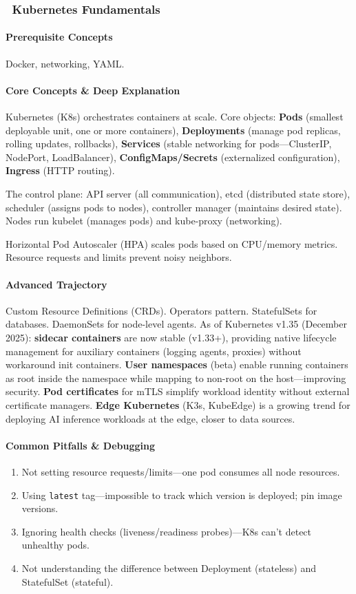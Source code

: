 \documentclass[11pt, a4paper, oneside]{report}
\newcommand{\mustmaster}[1]{\subsubsection{\texorpdfstring{\fcolorbox{blue!40!black}{blue!8}{\footnotesize\bfseries\color{blue!40!black} MUST MASTER}~#1}{#1}}}
\begin{document}
\mustmaster{Kubernetes Fundamentals}

\paragraph{Prerequisite Concepts} Docker, networking, YAML.

\paragraph{Core Concepts \& Deep Explanation} Kubernetes (K8s) orchestrates containers at scale. Core objects: \textbf{Pods} (smallest deployable unit, one or more containers), \textbf{Deployments} (manage pod replicas, rolling updates, rollbacks), \textbf{Services} (stable networking for pods---ClusterIP, NodePort, LoadBalancer), \textbf{ConfigMaps/Secrets} (externalized configuration), \textbf{Ingress} (HTTP routing).

The control plane: API server (all communication), etcd (distributed state store), scheduler (assigns pods to nodes), controller manager (maintains desired state). Nodes run kubelet (manages pods) and kube-proxy (networking).

Horizontal Pod Autoscaler (HPA) scales pods based on CPU/memory metrics. Resource requests and limits prevent noisy neighbors.

\paragraph{Advanced Trajectory} Custom Resource Definitions (CRDs). Operators pattern. StatefulSets for databases. DaemonSets for node-level agents. As of Kubernetes v1.35 (December 2025): \textbf{sidecar containers} are now stable (v1.33+), providing native lifecycle management for auxiliary containers (logging agents, proxies) without workaround init containers. \textbf{User namespaces} (beta) enable running containers as root inside the namespace while mapping to non-root on the host---improving security. \textbf{Pod certificates} for mTLS simplify workload identity without external certificate managers. \textbf{Edge Kubernetes} (K3s, KubeEdge) is a growing trend for deploying AI inference workloads at the edge, closer to data sources.

\paragraph{Common Pitfalls \& Debugging}
\begin{enumerate}[leftmargin=*]
\item Not setting resource requests/limits---one pod consumes all node resources.
\item Using \texttt{latest} tag---impossible to track which version is deployed; pin image versions.
\item Ignoring health checks (liveness/readiness probes)---K8s can't detect unhealthy pods.
\item Not understanding the difference between Deployment (stateless) and StatefulSet (stateful).
\end{enumerate}
\end{document}
